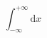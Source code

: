 \documentclass{ctexart}
\begin{document}
\begin{equation}
  \int_{-\infty}^{+\infty}  \mathrm{d}x 
\end{equation}
\end{document}
